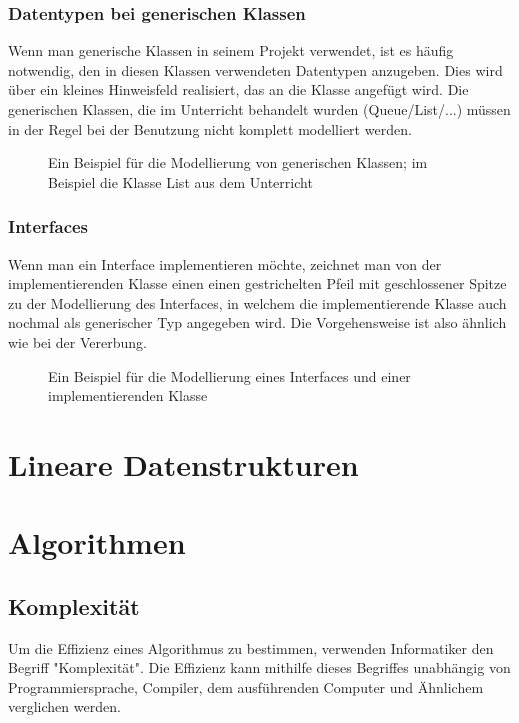\documentclass{article}
\begin{document}
	\subsubsection{Datentypen bei generischen Klassen}
	Wenn man generische Klassen in seinem Projekt verwendet, ist es häufig notwendig, den in diesen Klassen verwendeten Datentypen anzugeben. Dies wird über ein kleines Hinweisfeld realisiert, das an die Klasse angefügt wird. Die generischen Klassen, die im Unterricht behandelt wurden (Queue/List/...) müssen in der Regel bei der Benutzung nicht komplett modelliert werden. 

	\begin{figure}[h!]
		\centering
		
		\caption{Ein Beispiel für die Modellierung von generischen Klassen; im Beispiel die Klasse List aus dem Unterricht}
	\end{figure}

	\subsubsection{Interfaces}
	Wenn man ein Interface implementieren möchte, zeichnet man von der implementierenden Klasse einen einen gestrichelten Pfeil mit geschlossener Spitze zu der Modellierung des Interfaces, in welchem die implementierende Klasse auch nochmal als generischer Typ angegeben wird. Die Vorgehensweise ist also ähnlich wie bei der Vererbung.

	\begin{figure}[h!]
		\centering
		
		\caption{Ein Beispiel für die Modellierung eines Interfaces und einer implementierenden Klasse}
	\end{figure}
	

	\section{Lineare Datenstrukturen}

	\section{Algorithmen}
	\subsection{Komplexität}
	Um die Effizienz eines Algorithmus zu bestimmen, verwenden Informatiker den Begriff "Komplexität". Die Effizienz kann mithilfe dieses Begriffes unabhängig von Programmiersprache, Compiler, dem ausführenden Computer und Ähnlichem verglichen werden.
\end{document}
